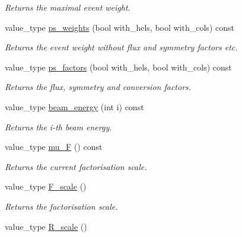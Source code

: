 \begin{DoxyCompactItemize}
\begin{DoxyCompactList}\small\item\em Returns the maximal event weight. \end{DoxyCompactList}\item 
value\-\_\-type \hyperlink{a00430_ad5df91b2c5e630adc9e59b499ded970f}{ps\-\_\-weights} (bool with\-\_\-hels, bool with\-\_\-cols) const 
\begin{DoxyCompactList}\small\item\em Returns the event weight without flux and symmetry factors etc. \end{DoxyCompactList}\item 
value\-\_\-type \hyperlink{a00430_ad13dc7c85318802813697cdeeeee0e57}{ps\-\_\-factors} (bool with\-\_\-hels, bool with\-\_\-cols) const 
\begin{DoxyCompactList}\small\item\em Returns the flux, symmetry and conversion factors. \end{DoxyCompactList}\item 
\hypertarget{a00430_acea9c82d86081354dfa1db7bbf2a86da}{value\-\_\-type \hyperlink{a00430_acea9c82d86081354dfa1db7bbf2a86da}{beam\-\_\-energy} (int i) const }\label{a00430_acea9c82d86081354dfa1db7bbf2a86da}

\begin{DoxyCompactList}\small\item\em Returns the i-\/th beam energy. \end{DoxyCompactList}\item 
\hypertarget{a00430_aa9339b30978ba9c659986995f50246b9}{value\-\_\-type \hyperlink{a00430_aa9339b30978ba9c659986995f50246b9}{mu\-\_\-\-F} () const }\label{a00430_aa9339b30978ba9c659986995f50246b9}

\begin{DoxyCompactList}\small\item\em Returns the current factorisation scale. \end{DoxyCompactList}\item 
\hypertarget{a00430_a59b6a343a569e528b7696037e66b46c4}{value\-\_\-type \hyperlink{a00430_a59b6a343a569e528b7696037e66b46c4}{F\-\_\-scale} ()}\label{a00430_a59b6a343a569e528b7696037e66b46c4}

\begin{DoxyCompactList}\small\item\em Returns the factorisation scale. \end{DoxyCompactList}\item 
\hypertarget{a00430_a01dcc402f85247beb330b81fb5db1290}{value\-\_\-type \hyperlink{a00430_a01dcc402f85247beb330b81fb5db1290}{R\-\_\-scale} ()}\label{a00430_a01dcc402f85247beb330b81fb5db1290}


\end{DoxyCompactItemize}

